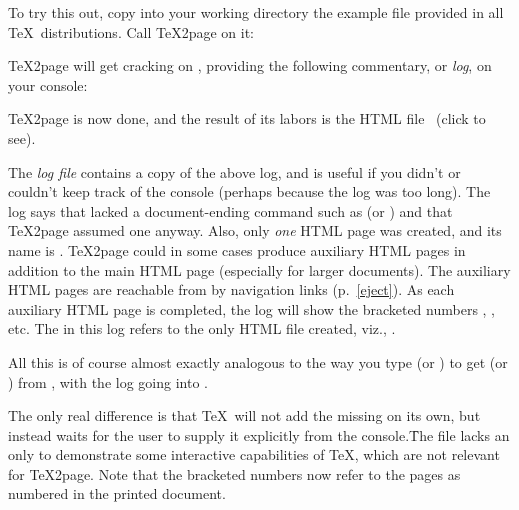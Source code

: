 
To try this out, copy into your working directory the
example file  provided in all \TeX\
distributions.
Call \TeX2page on it:


\n
{}
%
\TeX2page will get cracking on , providing
the following commentary, or {\em log}, on your console:

\medbreak

\medbreak

\n \TeX2page is now done, and the result of its labors
is the HTML file
\ifx\shipout\UnDeFiNeD\ (click
to see)\fi.


The {\em log file} 
contains a copy of the above log, and is useful
if you didn't or couldn't keep track of the console
(perhaps because the log was too long).
The log says that  lacked a
document-ending command such as \p{\end} (or \p{\bye})
and that \TeX2page assumed one anyway.  Also, only
{\em one} HTML page was created, and its name is
.  \TeX2page could in some cases produce
auxiliary HTML pages in addition to
the main HTML page  (especially
for larger documents).  The auxiliary HTML pages
are reachable from 
by navigation links (p.~\ref{eject}).  As  each
auxiliary HTML page is completed, the log will show the
bracketed numbers \p{[1]}, \p{[2]}, etc.  The \p{[0]}
in this log refers to the only HTML file created, viz.,
.

All this is of course almost exactly analogous to the
way you type  (or ) to get
 (or )
from , with the log going into
.

\medbreak

\medbreak

\n The only real difference is
that \TeX\ will not add the missing \p{\end} on its
own, but instead waits for the user to supply it
explicitly from the console.\f{The file 
lacks an \p{\end} only to demonstrate some interactive
capabilities of \TeX, which are not relevant for
\TeX2page.}  Note that the bracketed numbers now refer
to the pages as numbered in the printed document.

